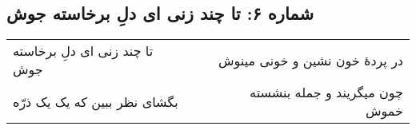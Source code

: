 \begin{center}
\section*{شماره ۶: تا چند زنی ای دلِ برخاسته جوش}
\label{sec:006}
\begin{longtable}{l p{0.5cm} r}
تا چند زنی ای دلِ برخاسته جوش
&&
در پردهٔ خون نشین و خونی مینوش
\\
بگشای نظر ببین که یک یک ذرّه
&&
چون میگریند و جمله بنشسته خموش
\\
\end{longtable}
\end{center}

